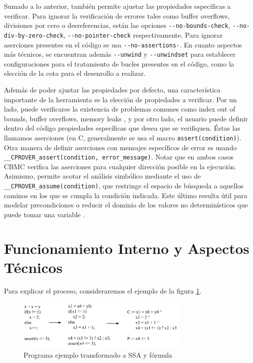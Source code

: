 \documentclass[runningheads]{llncs}
\begin{document}
Sumado a lo anterior, también permite ajustar las propiedades específicas a verificar.
Para ignorar la verificación de errores tales como buffer overflows, divisiones por cero o desreferencias, están las opciones \verb|--no-bounds-check|, 
\verb|--no-div-by-zero-check|, \verb|--no-pointer-check| respectivamente.
Para ignorar aserciones presentes en el código se usa \verb|--no-assertions-|.
En cuanto aspectos más técnicos, se encuentran además \verb|--unwind| y \verb|--unwindset| para establecer configuraciones para el tratamiento de bucles 
presentes en el código, como la elección de la cota para el desenrollo a realizar. \cite{cbmc-manual}

Además de poder ajustar las propiedades por defecto, una característica importante de la herramienta es la elección de propiedades a verificar.
Por un lado, puede verificarse la existencia de problemas comunes como index out of bounds, buffer overflows, memory leaks \cite{cbmc-paper}, y por otro lado,
el usuario puede definir dentro del código propiedades específicas que desea que se verifiquen.
Éstas las llamamos aserciones (en C, generalmente se usa el macro \verb|assert(condition)|).
Otra manera de definir aserciones con mensajes específicos de error es usando \verb|__CPROVER_assert(condition, error_message)|.
Notar que en ambos casos CBMC verifica las aserciones para cualquier dirección posible en la ejecución.
Asimismo, permite acotar el análisis simbólico mediante el uso de \verb|__CPROVER_assume(condition)|, que restringe el espacio de búsqueda a aquellos caminos 
en los que se cumpla la condición indicada.
Este último resulta útil para modelar precondiciones o reducir el dominio de los valores no determinísticos que puede tomar una variable \cite{cbmc-paper}.

%
\section{Funcionamiento Interno y Aspectos Técnicos}
Para explicar el proceso, consideraremos el ejemplo de la figura \ref{fig: code-conversion}.
\begin{figure}[!htb]
  \centering
  \includegraphics[width=0.75\textwidth]{code-conversion.jpg}
  \caption{Programa ejemplo transformado a SSA y fórmula}
  \label{fig: code-conversion}
\end{figure}
\end{document}
